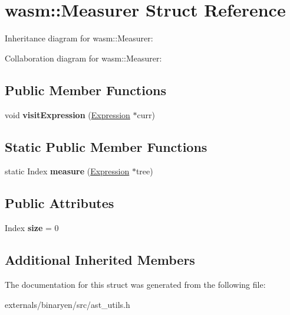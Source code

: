 \hypertarget{structwasm_1_1_measurer}{}\section{wasm\+:\+:Measurer Struct Reference}
\label{structwasm_1_1_measurer}


Inheritance diagram for wasm\+:\+:Measurer\+:


Collaboration diagram for wasm\+:\+:Measurer\+:
\subsection*{Public Member Functions}
\begin{DoxyCompactItemize}
\item 
\mbox{\label{structwasm_1_1_measurer_acbed4ae14f1757227a973e996ca26141}} 
void {\bfseries visit\+Expression} (\mbox{\hyperlink{classwasm_1_1_expression}{Expression}} $\ast$curr)
\end{DoxyCompactItemize}
\subsection*{Static Public Member Functions}
\begin{DoxyCompactItemize}
\item 
\mbox{\label{structwasm_1_1_measurer_ae3fdd9f51953f7a5a60a46fc90f2a201}} 
static Index {\bfseries measure} (\mbox{\hyperlink{classwasm_1_1_expression}{Expression}} $\ast$tree)
\end{DoxyCompactItemize}
\subsection*{Public Attributes}
\begin{DoxyCompactItemize}
\item 
\mbox{\label{structwasm_1_1_measurer_aaa586c7d106c74bacc8d72ddc5b75e11}} 
Index {\bfseries size} = 0
\end{DoxyCompactItemize}
\subsection*{Additional Inherited Members}


The documentation for this struct was generated from the following file\+:\begin{DoxyCompactItemize}
\item 
externals/binaryen/src/ast\+\_\+utils.\+h\end{DoxyCompactItemize}
